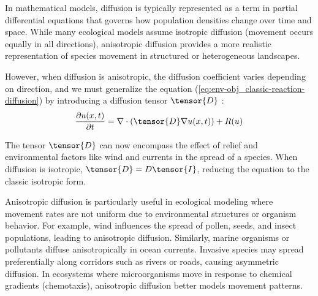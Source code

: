 In mathematical models, diffusion is typically represented as a term in partial differential equations that governs how population densities change over time and space. While many ecological models assume isotropic diffusion (movement occurs equally in all directions), anisotropic diffusion provides a more realistic representation of species movement in structured or heterogeneous landscapes.

However, when diffusion is anisotropic, the diffusion coefficient varies depending on direction, and we must generalize the equation (\cref{eq:env-obj_classic-reaction-diffusion}) by introducing a diffusion tensor $\tensor{D}$ \cite{Ramos2024}:
\begin{align}
    \label{eq:env-obj_reaction-diffusion}
    \frac{\partial u (x, t)}{\partial t} = \nabla \cdot (\tensor{D} \nabla u(x, t)) + R(u)
\end{align}

The tensor $\tensor{D}$ can now encompass the effect of relief and environmental factors like wind and currents in the spread of a species. When diffusion is isotropic, $\tensor{D} = D\tensor{I}$, reducing the equation to the classic isotropic form.

Anisotropic diffusion is particularly useful in ecological modeling where movement rates are not uniform due to environmental structures or organism behavior. For example, wind influences the spread of pollen, seeds, and insect populations, leading to anisotropic diffusion. Similarly, marine organisms or pollutants diffuse anisotropically in ocean currents.
Invasive species may spread preferentially along corridors such as rivers or roads, causing asymmetric diffusion. In ecosystems where microorganisms move in response to chemical gradients (chemotaxis), anisotropic diffusion better models movement patterns.


